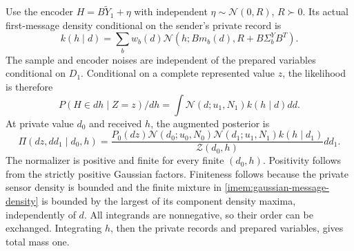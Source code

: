 Use the encoder $H=B\widetilde Y_1+\eta$ with independent $\eta\sim\mathcal N(0,R)$, $R\succ0$. Its actual first-message density conditional on the sender's private record is
\begin{equation}
 k(h\mid d)=\sum_b w_b(d)
 \mathcal N(h;Bm_b(d),R+B\Sigma_b^YB^T).
 \label{imem:gaussian-message-density}
\end{equation}
The sample and encoder noises are independent of the prepared variables conditional on $D_1$. Conditional on a complete represented value $z$, the likelihood is therefore
\begin{equation}
 P(H\in dh\mid Z=z)/dh
 =\int\mathcal N(d;u_1,N_1)k(h\mid d)dd.
 \label{imem:gaussian-integrated-likelihood}
\end{equation}
At private value $d_0$ and received $h$, the augmented posterior is
\begin{equation}
 \Pi(dz,dd_1\mid d_0,h)
 =\frac{P_0(dz)\mathcal N(d_0;u_0,N_0)
       \mathcal N(d_1;u_1,N_1)k(h\mid d_1)}
       {\mathcal Z(d_0,h)}dd_1.
 \label{imem:gaussian-augmented-posterior}
\end{equation}
The normalizer is positive and finite for every finite $(d_0,h)$. Positivity follows from the strictly positive Gaussian factors. Finiteness follows because the private sensor density is bounded and the finite mixture in \cref{imem:gaussian-message-density} is bounded by the largest of its component density maxima, independently of $d$. All integrands are nonnegative, so their order can be exchanged. Integrating $h$, then the private records and prepared variables, gives total mass one.

